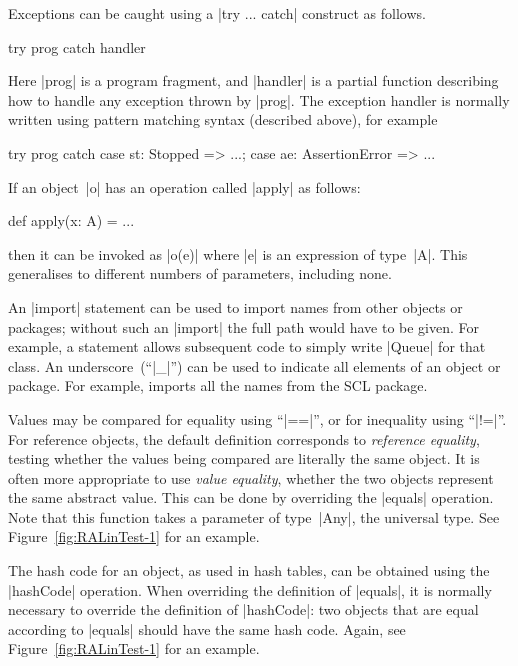 Exceptions can be caught using a |try ... catch|%
 construct as follows.
\begin{scala}
  try{ prog } catch{ handler }
\end{scala}
%
Here |prog| is a program fragment, and |handler| is a partial function
describing how to handle any exception thrown by |prog|.  The exception
handler is normally written using pattern matching syntax (described above),
for example%
\begin{scala}
  try{ prog } catch{ case st: Stopped => ...; case ae: AssertionError => ... }
\end{scala}


If an object~|o| has an operation called |apply| as follows:
\begin{scala}
  def apply(x: A) = ...
\end{scala}
then it can be invoked as |o(e)| where  |e| is an expression of type~|A|.
This generalises to different numbers of parameters, including none.  


An |import| statement can be used to import names from
other objects or packages; without such an |import| the full path would have
to be given.  For example, a statement
allows subsequent code to simply write |Queue| for that class.  An
underscore~(``|_|'') can be used to indicate all elements of an object or
package.  For example, 
imports all the names from the SCL package. 

Values may be compared for equality using ``|==|'', or for inequality using
``|!=|''.  For reference objects, the default definition corresponds to
\emph{reference equality}, testing whether the
values being compared are literally the same object.  It is often more
appropriate to use \emph{value equality}, whether the
two objects represent the same abstract value.  This can be done by overriding
the |equals| operation.  Note that this function takes a
parameter of type~|Any|, the universal type.  See
Figure~\ref{fig:RALinTest-1} for an example.

The hash code for an object, as used in hash tables, can be obtained using
the |hashCode| operation.  When overriding the definition of |equals|, it is
normally necessary to override the definition of
|hashCode|: two objects that are equal according to
|equals| should have the same hash code.  Again, see
Figure~\ref{fig:RALinTest-1} for an example.

